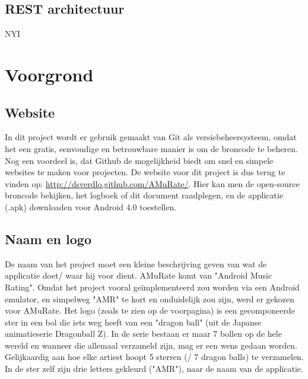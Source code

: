 \documentclass[11pt,a4paper]{article}
\begin{document}
	\subsection{REST architectuur}
	NYI
\section{Voorgrond}
	\subsection{Website}
		In dit project wordt er gebruik gemaakt van Git als versiebeheersysteem, omdat het een gratis, eenvoudige en betrouwbare manier is om de broncode te beheren. Nog een voordeel is, dat Github de mogelijkheid biedt om snel en simpele websites te maken voor projecten. De website voor dit project is dus terug te vinden op: \url{http://dsverdlo.github.com/AMuRate/}. Hier kan men de open-source broncode bekijken, het logboek of dit document raadplegen, en de applicatie (.apk) downloaden voor Android 4.0 toestellen.
	\subsection{Naam en logo}
		De naam van het project moet een kleine beschrijving geven van wat de applicatie doet/ waar hij voor dient. AMuRate komt van "Android Music Rating". Omdat het project vooral geïmplementeerd zou worden via een Android emulator, en simpelweg "AMR" te kort en onduidelijk zou zijn, werd er gekozen voor AMuRate. Het logo (zoals te zien op de voorpagina) is een gecomponeerde ster in een bol die iets weg heeft van een "dragon ball" (uit de Japanse animatieserie Dragonball Z). In de serie bestaan er maar 7 bollen op de hele wereld en wanneer die allemaal verzameld zijn, mag er een wens gedaan worden. Gelijkaardig aan hoe elke artiest hoopt 5 sterren (/ 7 dragon balls) te verzamelen. 
	In de ster zelf zijn drie letters gekleurd ("AMR"), naar de naam van de applicatie.
\end{document}
